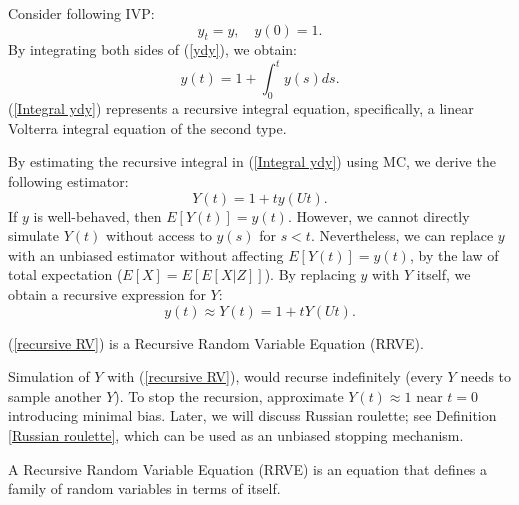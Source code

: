 \documentclass[a4paper,12pt]{article}
\begin{document}
\begin{example}[$y'=y$]
  Consider following IVP:
  \begin{equation} \label{ydy}
    y_t = y, \quad y(0) = 1.
  \end{equation}
  By integrating both sides of (\ref{ydy}), we obtain:
  \begin{equation} \label{Integral ydy}
    y(t) = 1 + \int_{0}^{t} y(s) ds.
  \end{equation}
  (\ref{Integral ydy}) represents a recursive integral equation,
  specifically, a linear Volterra integral equation of the second type.

  By estimating the recursive integral in (\ref{Integral ydy})
  using MC, we derive the following estimator:
  \begin{equation}
    Y(t) = 1 + t  y(Ut).
  \end{equation}
  If $y$ is well-behaved, then $E[Y(t)] = y(t)$.
  However, we cannot directly simulate $Y(t)$ without access
  to $y(s)$ for $s < t$. Nevertheless, we can replace $y$ with
  an unbiased estimator without affecting $E[Y(t)] = y(t)$,
  by the law of total expectation ($E[X] = E[E[X|Z]]$).
  By replacing $y$ with $Y$ itself, we obtain a recursive
  expression for $Y$:
  \begin{equation} \label{recursive RV}
    y(t) \approx Y(t) = 1 + t  Y(Ut).
  \end{equation}


  (\ref{recursive RV}) is a Recursive Random Variable
  Equation (RRVE).

  Simulation of $Y$ with (\ref{recursive RV}),
  would recurse indefinitely (every $Y$ needs to sample another $Y$).
  To stop the recursion, approximate
  $Y(t) \approx 1$ near $t = 0$ introducing minimal bias.
  Later, we will discuss Russian roulette; see Definition \ref{Russian roulette},
  which can be used as an unbiased stopping mechanism.

\end{example}

\begin{definition}
  A Recursive Random Variable Equation (RRVE) is
  an equation that defines a
  family of random variables in terms of itself.
\end{definition}
\end{document}
